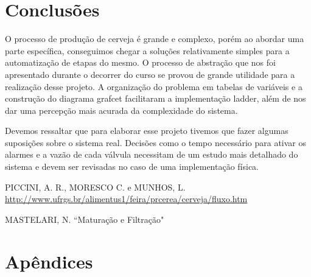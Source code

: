 \documentclass[twoside,twocolumn, 12pt]{paper}
\begin{document}
\section {Conclusões}
O processo de produção de cerveja é grande e complexo, porém ao abordar uma parte específica, conseguimos chegar a soluções relativamente simples para a automatização de etapas do mesmo. O processo de abstração que nos foi apresentado durante o decorrer do curso se provou de grande utilidade para a realização desse projeto. A organização do problema em tabelas de variáveis e a construção do diagrama grafcet facilitaram a implementação ladder, além de nos dar uma percepção mais acurada da complexidade do sistema.

Devemos ressaltar que para elaborar esse projeto tivemos que fazer algumas suposições sobre o sistema real. Decisões como o tempo necessário para ativar os alarmes e a vazão de cada válvula necessitam de um estudo mais detalhado do sistema e devem ser revisadas no caso de uma implementação física.
\begin{thebibliography}{5}
	  PICCINI, A. R., MORESCO C. e MUNHOS, L. \url{http://www.ufrgs.br/alimentus1/feira/prcerea/cerveja/fluxo.htm}
	
	 MASTELARI, N. ``Maturação e Filtração"
\end{thebibliography}
\newpage
\clearpage
\appendix
\section{Apêndices}

\label{apx:table}


\label{apx:ladder}


\label{apx:ihm}


\end{document}
